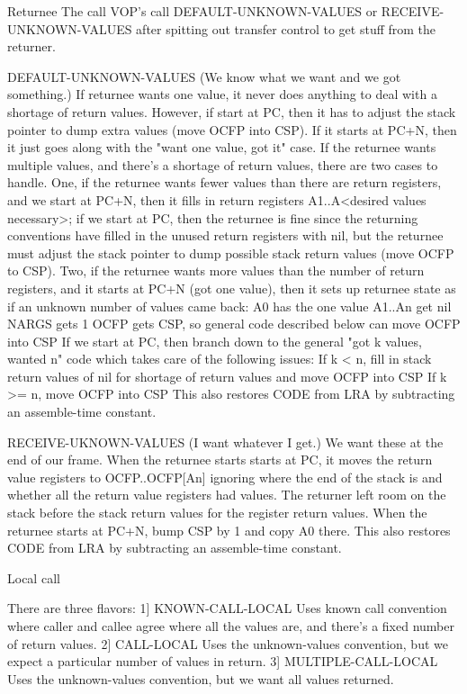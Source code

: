 Returnee
The call VOP's call DEFAULT-UNKNOWN-VALUES or RECEIVE-UNKNOWN-VALUES after
spitting out transfer control to get stuff from the returner.

DEFAULT-UNKNOWN-VALUES
(We know what we want and we got something.)
If returnee wants one value, it never does anything to deal with a shortage
of return values.  However, if start at PC, then it has to adjust the stack
pointer to dump extra values (move OCFP into CSP).  If it starts at PC+N,
then it just goes along with the "want one value, got it" case.
If the returnee wants multiple values, and there's a shortage of return
values, there are two cases to handle.  One, if the returnee wants fewer
values than there are return registers, and we start at PC+N, then it fills
in return registers A1..A<desired values necessary>; if we start at PC,
then the returnee is fine since the returning conventions have filled in
the unused return registers with nil, but the returnee must adjust the
stack pointer to dump possible stack return values (move OCFP to CSP).
Two, if the returnee wants more values than the number of return registers,
and it starts at PC+N (got one value), then it sets up returnee state as if
an unknown number of values came back:
   A0 has the one value
   A1..An get nil
   NARGS gets 1
   OCFP gets CSP, so general code described below can move OCFP into CSP
If we start at PC, then branch down to the general "got k values, wanted n"
code which takes care of the following issues:
   If k < n, fill in stack return values of nil for shortage of return
      values and move OCFP into CSP
   If k >= n, move OCFP into CSP
This also restores CODE from LRA by subtracting an assemble-time constant.

RECEIVE-UKNOWN-VALUES
(I want whatever I get.)
We want these at the end of our frame.  When the returnee starts starts at
PC, it moves the return value registers to OCFP..OCFP[An] ignoring where
the end of the stack is and whether all the return value registers had
values.  The returner left room on the stack before the stack return values
for the register return values.  When the returnee starts at PC+N, bump CSP
by 1 and copy A0 there.
This also restores CODE from LRA by subtracting an assemble-time constant.


Local call

There are three flavors:
   1] KNOWN-CALL-LOCAL
      Uses known call convention where caller and callee agree where all
      the values are, and there's a fixed number of return values.
   2] CALL-LOCAL
      Uses the unknown-values convention, but we expect a particular
      number of values in return.
   3] MULTIPLE-CALL-LOCAL
      Uses the unknown-values convention, but we want all values returned.

